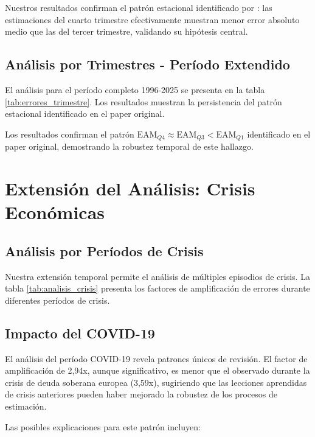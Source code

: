 \documentclass[12pt,a4paper]{article}
\begin{document}


Nuestros resultados confirman el patrón estacional identificado por \citet{pavia2017}: las estimaciones del cuarto trimestre efectivamente muestran menor error absoluto medio que las del tercer trimestre, validando su hipótesis central.

\subsection{Análisis por Trimestres - Período Extendido}

El análisis para el período completo 1996-2025 se presenta en la tabla \ref{tab:errores_trimestre}. Los resultados muestran la persistencia del patrón estacional identificado en el paper original.



Los resultados confirman el patrón $\text{EAM}_{Q4} \approx \text{EAM}_{Q3} < \text{EAM}_{Q1}$ identificado en el paper original, demostrando la robustez temporal de este hallazgo.

\section{Extensión del Análisis: Crisis Económicas}

\subsection{Análisis por Períodos de Crisis}

Nuestra extensión temporal permite el análisis de múltiples episodios de crisis. La tabla \ref{tab:analisis_crisis} presenta los factores de amplificación de errores durante diferentes períodos de crisis.



\subsection{Impacto del COVID-19}

El análisis del período COVID-19 revela patrones únicos de revisión. El factor de amplificación de 2,94x, aunque significativo, es menor que el observado durante la crisis de deuda soberana europea (3,59x), sugiriendo que las lecciones aprendidas de crisis anteriores pueden haber mejorado la robustez de los procesos de estimación.

Las posibles explicaciones para este patrón incluyen:
\end{document}
